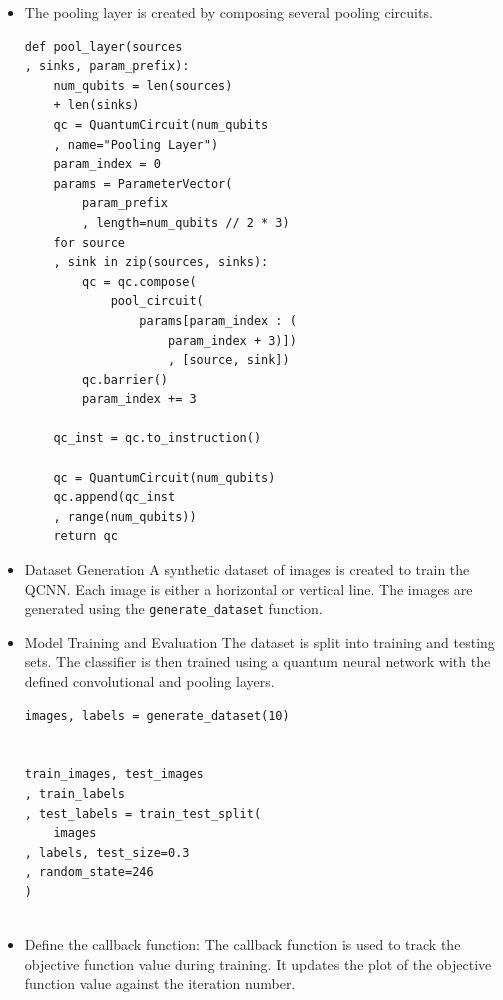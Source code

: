 \documentclass[conference]{IEEEtran}
\begin{document}
\begin{itemize}
{\small
\begin{verbatim}
def pool_circuit(params):
    target = QuantumCircuit(2)
    target.rz(-np.pi / 2, 1)
    target.cx(1, 0)
    target.rz(params[0], 0)
    target.ry(params[1], 1)
    target.cx(0, 1)
    target.ry(params[2], 1)
    return target
\end{verbatim}
}

    \item The pooling layer is created by composing several pooling circuits.

{\small
\begin{verbatim}
def pool_layer(sources
, sinks, param_prefix):
    num_qubits = len(sources) 
    + len(sinks)
    qc = QuantumCircuit(num_qubits
    , name="Pooling Layer")
    param_index = 0
    params = ParameterVector(
        param_prefix
        , length=num_qubits // 2 * 3)
    for source
    , sink in zip(sources, sinks):
        qc = qc.compose(
            pool_circuit(
                params[param_index : (
                    param_index + 3)])
                    , [source, sink])
        qc.barrier()
        param_index += 3

    qc_inst = qc.to_instruction()

    qc = QuantumCircuit(num_qubits)
    qc.append(qc_inst
    , range(num_qubits))
    return qc
\end{verbatim}
}

    \item Dataset Generation
    A synthetic dataset of images is created to train the QCNN. Each image is either a horizontal or vertical line.
    The images are generated using the \texttt{generate\_dataset} function.

    \item Model Training and Evaluation
    The dataset is split into training and testing sets. The classifier is then trained using a quantum neural network with the defined convolutional and pooling layers.

{\small
\begin{verbatim}
images, labels = generate_dataset(10)


train_images, test_images
, train_labels
, test_labels = train_test_split(
    images
, labels, test_size=0.3
, random_state=246
)
    
\end{verbatim}
}

    \item Define the callback function:
    The callback function is used to track the objective function value during training. It updates the plot of the objective function value against the iteration number.



\end{itemize}
\end{document}
